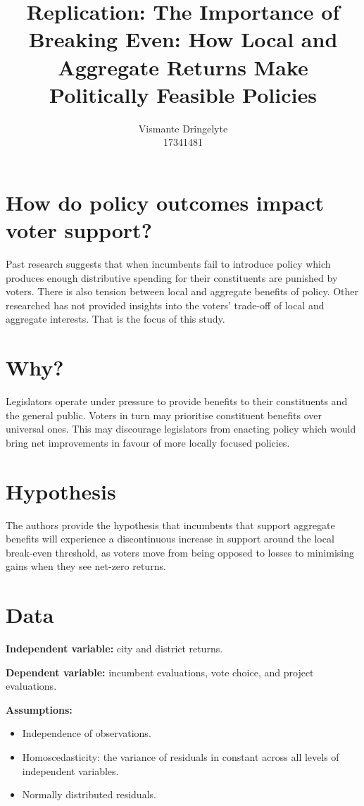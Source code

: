 \documentclass[12pt,letterpaper]{article}
\title{Replication: The Importance of Breaking Even: How Local and
	Aggregate Returns Make Politically Feasible Policies}
\author{Vismante Dringelyte\\
17341481}
\begin{document}
\maketitle
\section{How do policy outcomes impact voter support?}
Past research suggests that when incumbents fail to introduce policy which produces enough distributive spending for their constituents are punished by voters. There is also tension between local and aggregate benefits of policy. Other researched has not provided insights into the voters' trade-off of local and aggregate interests. That is the focus of this study.

\section{Why?}
Legislators operate under pressure to provide benefits to their constituents and the general public. Voters in turn may prioritise constituent benefits over universal ones. This may discourage legislators from enacting policy which would bring net improvements in favour of more locally focused policies.

\section{Hypothesis}
The authors provide the hypothesis that incumbents that support aggregate benefits will experience a discontinuous increase in support around the local break-even threshold, as voters move from being opposed to losses to minimising gains when they see net-zero returns.

\section{Data}
	 

\textbf{Independent variable:} city and district returns. 

\textbf{Dependent variable:} incumbent evaluations, vote choice, and project evaluations.

\newpage
\textbf{Assumptions:}
\begin{itemize}
	\item Independence of observations.
	\item Homoscedasticity: the variance of residuals in constant across all levels of independent variables.
	\item Normally distributed residuals.
\end{itemize}
\end{document}
